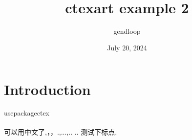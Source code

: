 \documentclass{article}
\title{ctexart example 2}
\author{gendloop}
\date{July 20, 2024}
\begin{document}
\maketitle

\section{Introduction}
usepackage{ctex}

\paragraph{}
可以用中文了,，，.,...,.. .. 测试下标点.
\end{document}
